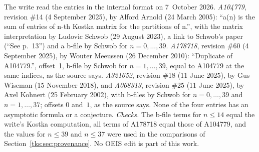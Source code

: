 \begin{remark}\label{tks:rem:oeis}
The write read the entries in the internal format on 7~October 2026.
\emph{A104779}, revision \#14 (4 September 2025), by Alford Arnold (24 March
2005): ``a(n) is the sum of entries of n-th Kostka matrix for the partitions
of n.'', with the matrix interpretation by Ludovic Schwob (29 August 2023), a
link to Schwob's paper (``See p.~13'') and a b-file by Schwob for
$n=0,\ldots,39$. \emph{A178718}, revision \#60 (4 September 2025), by Wouter
Meeussen (26 December 2010): ``Duplicate of A104779.'', offset~1, b-file by
Schwob for $n=1,\ldots,39$, equal to A104779 at the same indices, as the
source says. \emph{A321652}, revision \#18 (11 June 2025), by Gus Wiseman (15
November 2018), and \emph{A068313}, revision \#25 (11 June 2025), by Axel
Kohnert (25 February 2002), with b-files by Schwob for $n=0,\ldots,39$ and
$n=1,\ldots,37$; offsets $0$ and~$1$, as the source says. None of the four
entries has an asymptotic formula or a conjecture. \emph{Checks.} The b-file
terms for $n\le14$ equal the write's Kostka computation, all terms of
A178718 equal those of A104779, and the values for $n\le39$ and $n\le37$ were
used in the comparisons of Section~\ref{tks:sec:provenance}. No OEIS edit is
part of this work.
\end{remark}
